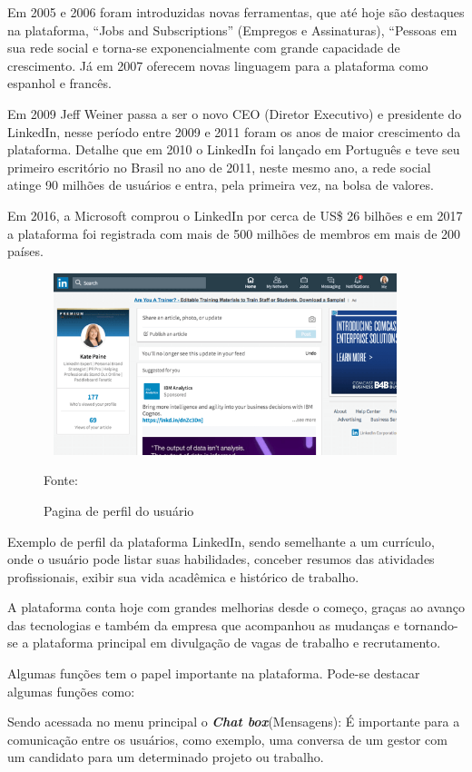 Em 2005 e 2006 foram introduzidas novas ferramentas, que até hoje são destaques na plataforma, “Jobs and Subscriptions” (Empregos e Assinaturas), “Pessoas em sua rede social e torna-se exponencialmente com grande capacidade de crescimento. Já em 2007 oferecem novas linguagem para a plataforma como espanhol e francês.

Em 2009 Jeff Weiner passa a ser o novo CEO (Diretor Executivo) e presidente do LinkedIn, nesse período entre 2009 e 2011 foram os anos de maior crescimento da plataforma. Detalhe que em 2010 o LinkedIn foi lançado em Português e teve seu primeiro escritório no Brasil no ano de 2011, neste mesmo ano, a rede social atinge 90 milhões de usuários e entra, pela primeira vez, na bolsa de valores.

Em 2016, a Microsoft comprou o LinkedIn por cerca de US\$ 26 bilhões e em 2017 a plataforma foi registrada com mais de 500 milhões de membros em mais de 200 países.

\begin{figure}[!h]
	\centering
	\caption{Pagina de perfil do usuário }
	\includegraphics[width=400px, height=200px]{./images/linkedin1.png}
	\par {Fonte: \cite{linkedin}}
\end{figure}

\newpage

Exemplo de perfil da plataforma LinkedIn, sendo semelhante a um currículo, onde o usuário pode listar suas habilidades, conceber resumos das atividades profissionais, exibir sua vida acadêmica e histórico de trabalho.
 
A plataforma conta hoje com grandes melhorias desde o começo, graças ao avanço das tecnologias e também da empresa que acompanhou as mudanças e tornando-se a plataforma principal em divulgação de vagas de trabalho e recrutamento. 

Algumas funções tem o papel importante na plataforma. Pode-se destacar algumas funções como:

Sendo acessada no menu principal o \textbf{\emph{Chat box}}(Mensagens): É importante para a comunicação entre os usuários, como exemplo, uma conversa de um gestor com um candidato para um determinado projeto ou trabalho.

